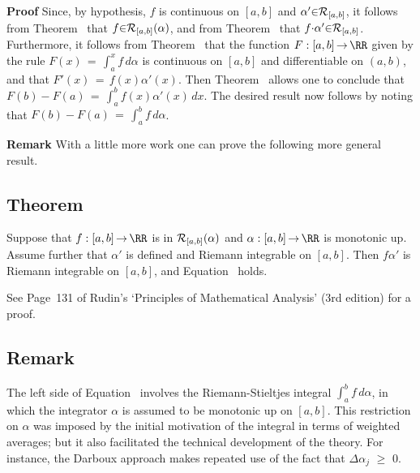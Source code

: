 \V

        {\bf Proof} Since, by hypothesis, $f$ is continuous on $[a,b]$ and ${\alpha}'{\in}{\cal R}_{[a,b]}$,
    it follows from Theorem~ that $f{\in}{\cal R}_{[a,b]}({\alpha})$,
    and from Theorem~ that $f{\cdot}{\alpha}'{\in}{\cal R}_{[a,b]}$.
    Furthermore, it follows from Theorem~ that the function $F:[a,b] \,{\rightarrow}\, {\RR}$ given by the rule
    ${\displaystyle F(x) \,=\, \int_{a}^{x} f\,d{\alpha}}$ is continuous on $[a,b]$ and differentiable on $(a,b)$, and that $F'(x) \,=\, f(x){\alpha}'(x)$.
    Then Theorem~ allows one to conclude that $F(b) - F(a) \,=\, {\displaystyle \int_{a}^{b} f(x){\alpha}'(x)\,dx}$.
    The desired result now follows by noting that ${\displaystyle F(b)-F(a) \,=\, \int_{a}^{b} f\,d{\alpha}}$.
    
\V

        {\bf Remark} With a little more work one can prove the following more general result.

        \subsection{\small{{\bf Theorem}}}
        \label{ThmH40.60}

\V

                Suppose that $f:[a,b] \,{\rightarrow}\, {\RR}$ is in ${\cal R}_{[a,b]}({\alpha})$ and ${\alpha}:[a,b] \,{\rightarrow}\, {\RR}$ is monotonic up.
    Assume further that ${\alpha}'$ is defined and Riemann integrable on $[a,b]$. Then $f{\alpha}'$ is Riemann integrable on $[a,b]$, and Equation~ holds.

\V

        See Page~131 of Rudin's `Principles of Mathematical Analysis' (3rd edition) for a proof.

\V
\V

    
        \subsection{\small{{\bf Remark}}}
        \label{RemrkH40.70}

\V

        The left side of Equation~ involves the Riemann-Stieltjes integral ${\displaystyle \int_{a}^{b}f\,d{\alpha}}$,
    in which the integrator ${\alpha}$ is assumed to be monotonic up on $[a,b]$. This restriction on ${\alpha}$ was imposed by the initial motivation of the integral in terms of weighted averages;
    but it also facilitated the technical development of the theory. For instance,
    the Darboux approach makes repeated use of the fact that ${\Delta}{\alpha}_{j}\,\,{\geq}\,\,0$.

